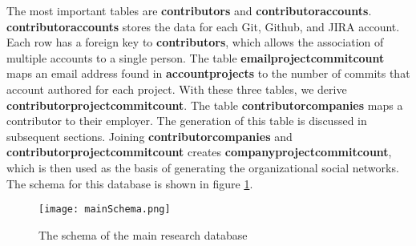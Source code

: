 The most important tables are \textbf{contributors} and \textbf{contributoraccounts}. \textbf{contributoraccounts} stores the data for each Git, Github, and JIRA account. Each row has a foreign key to \textbf{contributors}, which allows the association of multiple accounts to a single person. The table \textbf{emailprojectcommitcount} maps an email address found in \textbf{accountprojects} to the number of commits that account authored for each project. With these three tables, we derive \textbf{contributorprojectcommitcount}. The table \textbf{contributorcompanies} maps a contributor to their employer. The generation of this table is discussed in subsequent sections. Joining \textbf{contributorcompanies} and \textbf{contributorprojectcommitcount} creates \textbf{companyprojectcommitcount}, which is then used as the basis of generating the organizational social networks. The schema for this database is shown in figure \ref{fig:mainSchema}.
\begin{figure}
	\texttt{[image: mainSchema.png]}
	\centering
	\caption{The schema of the main research database}
	\label{fig:mainSchema}
\end{figure}


